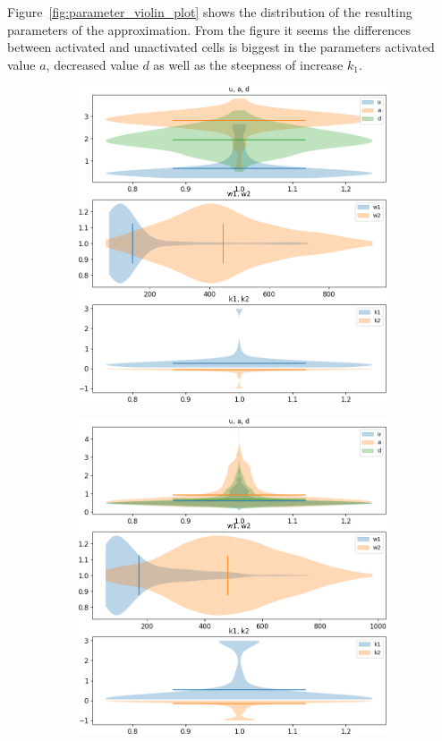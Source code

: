 Figure~\ref{fig:parameter_violin_plot} shows the distribution of the resulting parameters of the approximation. From the figure it seems the differences between activated and unactivated cells is biggest in the parameters activated value $a$, decreased value $d$ as well as the steepness of increase $k_1$.

\begin{figure}[h!]
	\centering
	\begin{subfigure}{0.45\linewidth}
		\includegraphics[width=\textwidth]{fig/parameter_violin_plot_human_pos}
	\end{subfigure}
	\hfill
	\begin{subfigure}{0.45\linewidth}
		\includegraphics[width=\textwidth]{fig/parameter_violin_plot_human_neg}
	\end{subfigure}
	

\end{figure}

